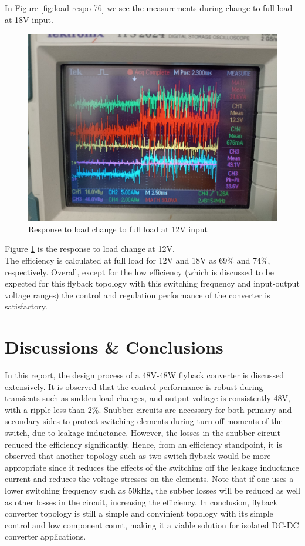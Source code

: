 \documentclass[12pt]{article}
\begin{document}
    In Figure \ref{fig:load-respo-76} we see the measurements during change to full load at 18V input.

    \begin{figure}[H]
        \centering
        \includegraphics[width = \textwidth]{img/in12loachange.jpeg}
        \caption{Response to load change to full load at 12V input}
        \label{fig:load-respo-12}
    \end{figure}

    Figure \ref{fig:load-respo-12} is the response to load change at 12V. \\

    The efficiency is calculated at full load for 12V and 18V as 69\% and 74\%, respectively. Overall, except for the low efficiency (which is discussed to be expected for this flyback topology with this switching frequency and input-output voltage ranges) the control and regulation performance of the converter is satisfactory.
    
\section{Discussions  \& Conclusions}
In this report, the design process of a 48V-48W flyback converter is discussed extensively. It is observed that the control performance is robust during transients such as sudden load changes, and output voltage is consistently 48V, with a ripple less than 2\%. Snubber circuits are necessary for both primary and secondary sides to protect switching elements during turn-off moments of the switch, due to leakage inductance. However, the losses in the snubber circuit reduced the efficiency significantly. Hence, from an efficiency standpoint, it is observed that another topology such as two switch flyback would be more appropriate since it reduces the effects of the switching off the leakage inductance current and reduces the voltage stresses on the elements. Note that if one uses a lower switching frequency such as 50kHz, the subber losses will be reduced as well as other losses in the circuit, increasing the efficiency. In conclusion, flyback converter topology is still a simple and convinient topology with its simple control and low component count, making it a viable solution for isolated DC-DC converter applications.
\end{document}
